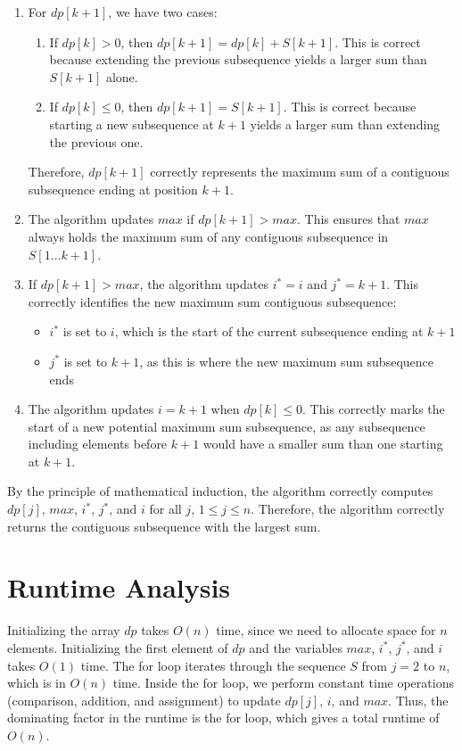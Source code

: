 \documentclass{article}
\begin{document}
\begin{enumerate}
    \item For $dp[k+1]$, we have two cases:
    \begin{enumerate}
        \item If $dp[k] > 0$, then $dp[k+1] = dp[k] + S[k+1]$. This is correct because extending the previous subsequence yields a larger sum than $S[k+1]$ alone.
        \item If $dp[k] \leq 0$, then $dp[k+1] = S[k+1]$. This is correct because starting a new subsequence at $k+1$ yields a larger sum than extending the previous one.
    \end{enumerate}
    Therefore, $dp[k+1]$ correctly represents the maximum sum of a contiguous subsequence ending at position $k+1$.

    \item The algorithm updates $max$ if $dp[k+1] > max$. This ensures that $max$ always holds the maximum sum of any contiguous subsequence in $S[1\ldots k+1]$.

    \item If $dp[k+1] > max$, the algorithm updates $i^* = i$ and $j^* = k+1$. This correctly identifies the new maximum sum contiguous subsequence:
    \begin{itemize}
        \item $i^*$ is set to $i$, which is the start of the current subsequence ending at $k+1$
        \item $j^*$ is set to $k+1$, as this is where the new maximum sum subsequence ends
    \end{itemize}

    \item The algorithm updates $i = k+1$ when $dp[k] \leq 0$. This correctly marks the start of a new potential maximum sum subsequence, as any subsequence including elements before $k+1$ would have a smaller sum than one starting at $k+1$.
\end{enumerate}

By the principle of mathematical induction, the algorithm correctly computes $dp[j]$, $max$, $i^*$, $j^*$, and $i$ for all $j$, $1 \leq j \leq n$.
Therefore, the algorithm correctly returns the contiguous subsequence with the largest sum.

\section{Runtime Analysis}

Initializing the array $dp$ takes $O(n)$ time, since we need to allocate space for $n$ elements.
Initializing the first element of $dp$ and the variables $max$, $i^*$, $j^*$, and $i$ takes $O(1)$ time.
The for loop iterates through the sequence $S$ from $j = 2$ to $n$, which is in $O(n)$ time.
Inside the for loop, we perform constant time operations (comparison, addition, and assignment) to update $dp[j]$, $i$, and $max$.
Thus, the dominating factor in the runtime is the for loop, which gives a total runtime of $O(n)$.
\end{document}
